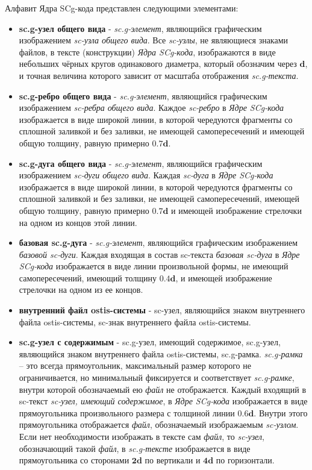 Алфавит Ядра SCg-кода представлен следующими элементами:
\begin{itemize}
	\item \textbf{sc.g-узел общего вида} - \textit{sc.g-элемент}, являющийся графическим изображением \textit{sc-узла общего вида}. Все \textit{sc-узлы}, не являющиеся знаками файлов, в тексте (конструкции) \textit{Ядра SCg-кода}, изображаются в виде небольших чёрных кругов одинакового диаметра, который обозначим через $\bm{d}$, и точная величина которого зависит от масштаба отображения \textit{sc.g-текста}.
	
	\item \textbf{sc.g-ребро общего вида} - \textit{sc.g-элемент}, являющийся графическим изображением \textit{sc-ребра общего вида}. Каждое \textit{sc-ребро} в \textit{Ядре SCg-кода} изображается в виде широкой линии, в которой чередуются фрагменты со сплошной заливкой и без заливки, не имеющей самопересечений и имеющей общую толщину, равную примерно $\bm{0.7d}$.
	
	\item \textbf{sc.g-дуга общего вида} - \textit{sc.g-элемент}, являющийся графическим изображением \textit{sc-дуги общего вида}. Каждая \textit{sc-дуга} в \textit{Ядре SCg-кода} изображается в виде широкой линии, в которой чередуются фрагменты со сплошной заливкой и без заливки, не имеющей самопересечений, имеющей общую толщину, равную примерно $\bm{0.7d}$ и имеющей изображение стрелочки на одном из концов этой линии.
	
	\item \textbf{базовая sc.g-дуга} - \textit{sc.g-элемент}, являющийся графическим изображением \textit{базовой sc-дуги}. Каждая входящая в состав sc-текста \textit{базовая sc-дуга} в \textit{Ядре SCg-кода} изображается в виде линии произвольной формы, не имеющий самопересечений, имеющий толщину $\bm{0.4d}$, и имеющей изображение стрелочки на одном из ее концов.
	
	\item \textbf{внутренний файл ostis-системы} - sc-узел, являющийся знаком внутреннего файла ostis-системы, sc-знак внутреннего файла ostis-системы.
	
	\item \textbf{sc.g-узел с содержимым} - sc.g-узел, имеющий содержимое, sc.g-узел, являющийся знаком внутреннего файла ostis-системы, sc.g-рамка. \textit{sc.g-рамка} -- это всегда прямоугольник, максимальный размер которого не ограничивается, но минимальный фиксируется и соответствует \textit{sc.g-рамке}, внутри которой обозначаемый ею \textit{файл} не отображается. Каждый входящий в sc-текст \textit{sc-узел, имеющий содержимое}, в \textit{Ядре SCg-кода} изображается в виде прямоугольника произвольного размера с толщиной линии $\bm{0.6d}$. Внутри этого прямоугольника отображается \textit{файл}, обозначаемый изображаемым \textit{sc-узлом}. Если нет необходимости изображать в тексте сам \textit{файл}, то \textit{sc-узел}, обозначающий такой \textit{файл}, в \textit{sc.g-тексте} изображается в виде прямоугольника со сторонами $\bm{2d}$ по вертикали и $\bm{4d}$ по горизонтали.
\end{itemize}


